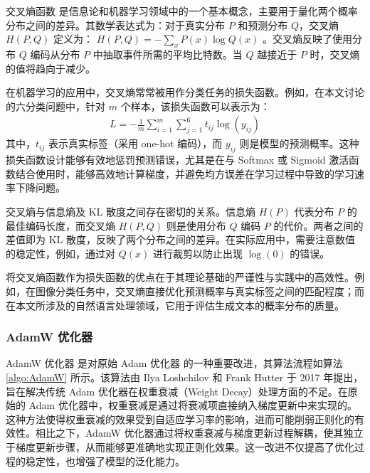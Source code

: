 交叉熵函数 \cite{CrossEntropy} 是信息论和机器学习领域中的一个基本概念，主要用于量化两个概率分布之间的差异。其数学表达式为：对于真实分布 \( P \) 和预测分布 \( Q \)，交叉熵 \( H(P, Q) \) 定义为：
\(
H(P, Q) = -\sum_x P(x) \log Q(x)
\)
。交叉熵反映了使用分布 \( Q \) 编码从分布 \( P \) 中抽取事件所需的平均比特数。当 \( Q \) 越接近于 \( P \) 时，交叉熵的值将趋向于减少。

在机器学习的应用中，交叉熵常常被用作分类任务的损失函数。例如，在本文讨论的六分类问题中，针对 \( m \) 个样本，该损失函数可以表示为：
\begin{align}
    L=-\frac{1}{m}\sum_{i=1}^m \sum_{j=1}^6 t_{ij}\log(y_{ij})
\end{align}
其中，\( t_{ij} \) 表示真实标签（采用 one-hot 编码），而 \( y_{ij} \) 则是模型的预测概率。这种损失函数设计能够有效地惩罚预测错误，尤其是在与 Softmax 或 Sigmoid 激活函数结合使用时，能够高效地计算梯度，并避免均方误差在学习过程中导致的学习速率下降问题。

交叉熵与信息熵及 KL 散度之间存在密切的关系。信息熵 \( H(P) \) 代表分布 \( P \) 的最佳编码长度，而交叉熵 \( H(P, Q) \) 则是使用分布 \( Q \) 编码 \( P \) 的代价。两者之间的差值即为 KL 散度，反映了两个分布之间的差异。在实际应用中，需要注意数值的稳定性，例如，通过对 \( Q(x) \) 进行裁剪以防止出现 \( \log(0) \) 的错误。

将交叉熵函数作为损失函数的优点在于其理论基础的严谨性与实践中的高效性。例如，在图像分类任务中，交叉熵直接优化预测概率与真实标签之间的匹配程度；而在本文所涉及的自然语言处理领域，它用于评估生成文本的概率分布的质量。

\subsubsection{AdamW 优化器}

AdamW 优化器 \cite{AdamW} 是对原始 Adam 优化器 \cite{Adam} 的一种重要改进，其算法流程如算法 \ref{algo:AdamW} 所示。该算法由 Ilya Loshchilov 和 Frank Hutter 于 2017 年提出，旨在解决传统 Adam 优化器在权重衰减（Weight Decay）处理方面的不足。在原始的 Adam 优化器中，权重衰减是通过将衰减项直接纳入梯度更新中来实现的。这种方法使得权重衰减的效果受到自适应学习率的影响，进而可能削弱正则化的有效性。相比之下，AdamW 优化器通过将权重衰减与梯度更新过程解耦，使其独立于梯度更新步骤，从而能够更准确地实现正则化效果。这一改进不仅提高了优化过程的稳定性，也增强了模型的泛化能力。

